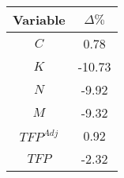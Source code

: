 {\fontshape\scdefault\selectfont 
\centering{} 
\begin{tabular}{cc} 
\hline\hline 
Variable & $\Delta \%$ \\ 
\hline 
$C$ &0.78\\ 
$K$ &-10.73\\ 
$N$ &-9.92\\ 
$M$ &-9.32\\ 
$TFP^{Adj}$ &0.92\\ 
$TFP$ &-2.32\\ 
\hline\hline 
\end{tabular} 
} 
